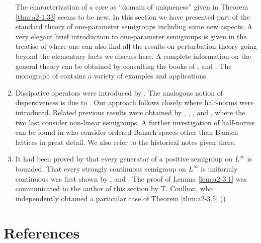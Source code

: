 \begin{enumerate}[label=\emph{Section \arabic*:}, wide, itemsep=1ex]
The characterization of a core as \enquote{domain of uniqueness} given in Theorem \ref{thm:a2-1.33}   seems to be new.
In this section we have presented part of the standard theory of one-parameter semigroups including some new aspects.
A very elegant brief introduction to one-parameter semigroups is given in the treatise of \citet{kato:1966} where one can also find all the results on perturbation theory going beyond the elementary facts we discuss here.
A complete information on the general theory can be obtained by consulting the books of \citet{davies:1980}, \citet{goldstein:1985a} and \citet{pazy:1983}.
The monograph of \citet{goldstein:1985a} contains a variety of examples and applications.

\item 
Dissipative operators were introduced by \citet{lumerphillips:1961}.
The analogous notion of dispersiveness is due to \citet{phillips:1962}.
Our approach follows closely \citet{arendtchernoffkato:1982} where half-norms were introduced.
Related previous results were obtained by \citet{calvert:1971a}, \citet{hasegawa:1966}, \citet{sato:1968}, \citet{benilanpicard:1979} and \citet{picard:1972}, where the two last consider non-linear semigroups.
A further investigation of half-norms can be found in \citet{battyrobinson:1984} who consider ordered Banach spaces other than Banach lattices in great detail.
We also refer to the historical notes given there.

\item
It had been proved by \citet{kishimotorobinson:1981} that every generator of a positive semigroup on $L^{\infty}$ is bounded.
That every strongly continuous semigroup on $L^{\infty}$ is uniformly continuous was first shown by \citet{lotz:1982}, \citet{lotz:1984} and \citet{lotz:1985}.
The proof of Lemma \ref{lem:a2-3.1}  was communicated to the author of this section by T. Coulhon, who independently obtained a particular case of Theorem \ref{thm:a2-3.5} (\citet{coulhon:1984}) .

\end{enumerate}

\section*{References}
{\RaggedRight
\renewcommand{\bibsection}{}

}
